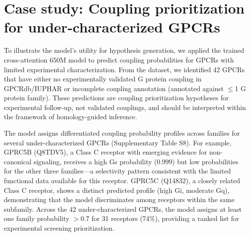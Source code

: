 \documentclass[11pt,a4paper]{article}
\begin{document}
\section{Case study: Coupling prioritization for under-characterized GPCRs}

To illustrate the model's utility for hypothesis generation, we applied the trained cross-attention 650M model to predict coupling probabilities for GPCRs with limited experimental characterization. From the dataset, we identified 42 GPCRs that have either no experimentally validated G protein coupling in GPCRdb/IUPHAR or incomplete coupling annotation (annotated against $\le$1 G protein family). These predictions are coupling prioritization hypotheses for experimental follow-up, not validated couplings, and should be interpreted within the framework of homology-guided inference.

The model assigns differentiated coupling probability profiles across families for several under-characterized GPCRs (Supplementary Table S8). For example, GPRC5B (Q8TDV5), a Class C receptor with emerging evidence for non-canonical signaling, receives a high Gs probability (0.999) but low probabilities for the other three families---a selectivity pattern consistent with the limited functional data available for this receptor. GPRC5C (Q14832), a closely related Class C receptor, shows a distinct predicted profile (high Gi, moderate Gq), demonstrating that the model discriminates among receptors within the same subfamily. Across the 42 under-characterized GPCRs, the model assigns at least one family probability $>$0.7 for 31 receptors (74\%), providing a ranked list for experimental screening prioritization.
\end{document}
